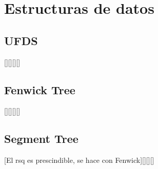 \chapter{Estructuras de datos}

\section{UFDS}
	[][][][]
	
\section{Fenwick Tree}
	[][][][]

\section{Segment Tree}
	[El rsq es prescindible, se hace con Fenwick][][][]